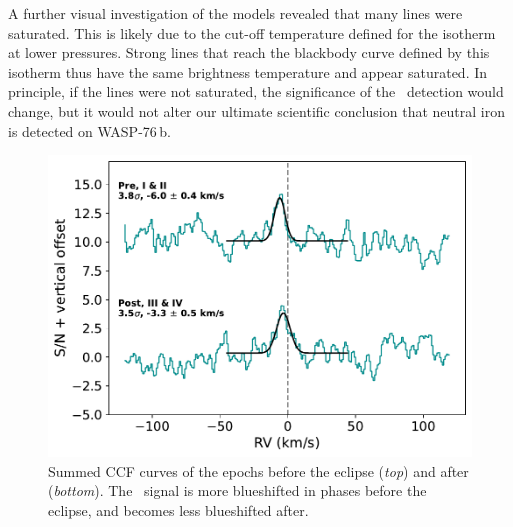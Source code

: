 \documentclass{aa}
\newcommand{\feI}{\ion{Fe}{i}}
\newcommand{\planet}{WASP-76\,b}
\begin{document}
A further visual investigation of the models revealed that many lines were saturated. This is likely due to the cut-off temperature defined for the isotherm at lower pressures. Strong lines that reach the blackbody curve defined by this isotherm thus have the same brightness temperature and appear saturated. In principle, if the lines were not saturated, the significance of the \feI\ detection would change, but it would not alter our ultimate scientific conclusion that neutral iron is detected on \planet.

\begin{figure}
    \centering\includegraphics[width=\hsize]{plots_submission2/W76b_Fe_ccf_snr_scaled_gauss_pre_post_summed_planetframe_ecc_zero_TP1_NEWg.pdf}
    \caption{Summed CCF curves of the epochs before the eclipse (\textit{top}) and after (\textit{bottom}). The \feI\ signal is more blueshifted in phases before the eclipse, and becomes less blueshifted after.}
    \label{fig:ccf_pre_post_eclipse}
\end{figure}

\end{document}
